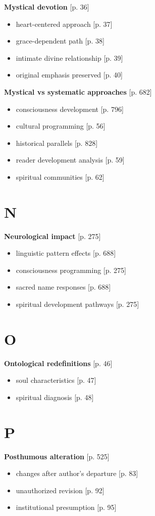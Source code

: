 \documentclass[11pt,twoside]{book}
\begin{document}
\textbf{\textbf{Mystical devotion}} {[}p. 36]
\begin{itemize}
\item heart-centered approach [p. 37]
\item grace-dependent path [p. 38]
\item intimate divine relationship [p. 39]
\item original emphasis preserved [p. 40]
\end{itemize}

\textbf{\textbf{Mystical vs systematic approaches}} {[}p. 682]
\begin{itemize}
\item consciousness development [p. 796]
\item cultural programming [p. 56]
\item historical parallels [p. 828]
\item reader development analysis [p. 59]
\item spiritual communities [p. 62]
\end{itemize}
\section*{N}
\label{sec:orgdb70e87}

\textbf{\textbf{Neurological impact}} {[}p. 275]
\begin{itemize}
\item linguistic pattern effects [p. 688]
\item consciousness programming [p. 275]
\item sacred name responses [p. 688]
\item spiritual development pathways [p. 275]
\end{itemize}
\section*{O}
\label{sec:org9860583}

\textbf{\textbf{Ontological redefinitions}} {[}p. 46]
\begin{itemize}
\item soul characteristics [p. 47]
\item spiritual diagnosis [p. 48]
\end{itemize}
\section*{P}
\label{sec:orgf546df8}

\textbf{\textbf{Posthumous alteration}} {[}p. 525]
\begin{itemize}
\item changes after author's departure [p. 83]
\item unauthorized revision [p. 92]
\item institutional presumption [p. 95]
\end{itemize}
\end{document}
